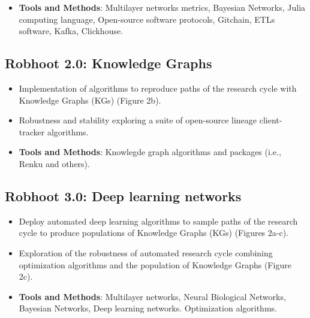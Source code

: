 \documentclass[10pt, a4paper, twocolumn]{article} %
\begin{document}
{   \begin{itemize}
   \item {\bf Tools and Methods}: Multilayer networks metrics,
     Bayesian Networks, Julia computing language, Open-source software
     protocols, Gitchain, ETLs software, Kafka, Clickhouse.
 \end{itemize}
 \vspace{-0.15 in}
   
  \subsection{Robhoot 2.0: Knowledge Graphs}
  \begin{itemize}
  \item Implementation of algorithms to reproduce paths of the
    research cycle with Knowledge Graphs (KGs) (Figure 2b).
  \item Robustness and stability exploring a suite of open-source
    lineage client-tracker algorithms.
  \end{itemize}

   \begin{itemize}
   \item {\bf Tools and Methods}: Knowlegde graph algorithms and
     packages (i.e., Renku and others).
 \end{itemize}
  \vspace{-0.15 in}
  
  \subsection{Robhoot 3.0: Deep learning networks}
  \begin{itemize}
  \item Deploy automated deep learning algorithms to sample paths of
    the research cycle to produce populations of Knowledge Graphs
    (KGs) (Figures 2a-c).
  \item Exploration of the robustness of automated research cycle combining
    optimization algorithms and the population of Knowledge Graphs
    (Figure 2c).
  \end{itemize}

 \begin{itemize}
 \item {\bf Tools and Methods}: Multilayer networks, Neural Biological
   Networks, Bayesian Networks, Deep learning networks. Optimization
   algorithms.
 \end{itemize}
  
  \vspace{-0.15 in}
  
}
\end{document}

